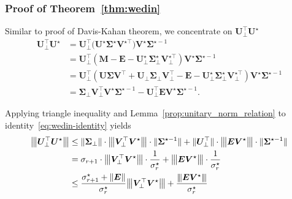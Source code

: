 \documentclass[compress,
mathserif,wide,%
]{beamer}
\begin{document}
\begin{frame}
	\frametitle{Proof of Theorem~\ref{thm:wedin}}
	Similar to proof of Davis-Kahan theorem, we concentrate on $\bm{U}_{\perp}^{\top}\bm{U}^{\star}$ 
	\begin{align}
\bm{U}_{\perp}^{\top}\bm{U}^{\star}
	& =\bm{U}_{\perp}^{\top}\big(\bm{U}^{\star}\bm{\Sigma}^{\star}\bm{V}^{\star\top}\big)\bm{V}^{\star}\bm{\Sigma}^{\star-1}\nonumber \\
	& =\bm{U}_{\perp}^{\top}\left(\bm{M}-\bm{E}-\bm{U}_{\perp}^{\star}\bm{\Sigma}_{\perp}^{\star}\bm{V}_{\perp}^{\star\top}\right)\bm{V}^{\star}\bm{\Sigma}^{\star-1}\nonumber \\
 & =\bm{U}_{\perp}^{\top}\left(\bm{U}\bm{\Sigma}\bm{V}^{\top}+\bm{U}_{\perp}\bm{\Sigma}_{\perp}\bm{V}_{\perp}^{\top}-\bm{E}-\bm{U}_{\perp}^{\star}\bm{\Sigma}_{\perp}^{\star}\bm{V}_{\perp}^{\star\top}\right)\bm{V}^{\star}\bm{\Sigma}^{\star-1}\nonumber \\
 & =\bm{\Sigma}_{\perp}\bm{V}_{\perp}^{\top}\bm{V}^{\star}\bm{\Sigma}^{\star-1}-\bm{U}_{\perp}^{\top}\bm{E}\bm{V}^{\star}\bm{\Sigma}^{\star-1} .
	\label{eq:wedin-identity}
\end{align}

Applying triangle inequality and Lemma~\ref{prop:unitary_norm_relation} to identity~\eqref{eq:wedin-identity}
yields
%
\begin{align}
\vertiiibig{\bm{U}_{\perp}^{\top}\bm{U}^{\star}}
	& \leq \|\bm{\Sigma}_{\perp}\| \cdot \vertiiibig{\bm{V}_{\perp}^{\top}\bm{V}^{\star}} \cdot \|\bm{\Sigma}^{\star-1}\|
	 +  \| \bm{U}_{\perp}^{\top}\|\cdot \vertiiibig{\bm{E}\bm{V}^{\star}} \cdot \|\bm{\Sigma}^{\star-1}\| \notag\\
	 & =  \sigma_{r+1} \cdot \vertiiibig{\bm{V}_{\perp}^{\top}\bm{V}^{\star}} \cdot \frac{1}{\sigma_r^{\star}}
	 + \vertiiibig{\bm{E}\bm{V}^{\star}} \cdot \frac{1}{\sigma_r^{\star}}
	   \notag\\
 & \leq\frac{\sigma_{r+1}^{\star}+\|\bm{E}\|}{\sigma_{r}^{\star}}\vertiiibig{\bm{V}_{\perp}^{\top}\bm{V}^{\star}}+\frac{\vertiii{\bm{E}\bm{V}^{\star}}}{\sigma_{r}^{\star}}
	\label{eq:Uperp-Ustar-UB}
\end{align}
\end{frame}
\end{document}
